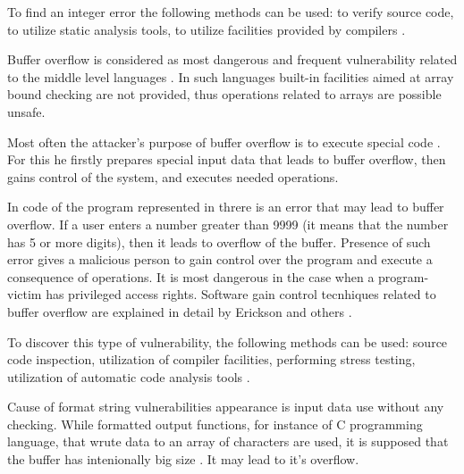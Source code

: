 %
To find an integer error the following methods can be used: to verify source code, to utilize static analysis tools, to utilize facilities provided by compilers  . 



%
Buffer overflow is considered as most dangerous and frequent vulnerability related to the middle level languages . 
%
In such languages built-in facilities aimed at array bound checking are not provided, thus operations related to arrays are possible unsafe. 

%
Most often the attacker's purpose of buffer overflow is to execute special code . 
%
For this he firstly prepares special input data that leads to buffer overflow, then gains control of the system, and executes needed operations. 

%
In code of the program represented in  threre is an error that may lead to buffer overflow. 
%
If a user enters a number greater than 9999 (it means that the number has 5 or more digits), then it leads to overflow of the  buffer. 
%
Presence of such error gives a malicious person to gain control over the program and execute a consequence of operations. 
%
It is most dangerous in the case when a program-victim has privileged access rights. 
%
Software gain control tecnhiques related to buffer overflow are explained in detail by Erickson and others  . 

%
To discover this type of vulnerability, the following methods can be used: source code inspection, utilization of compiler facilities, performing stress testing, utilization of automatic code analysis tools   . 



%
Cause of format string vulnerabilities appearance is input data use without any checking. 
%
While formatted output functions, for instance  of C programming language, that wrute data to an array of characters are used, it is supposed that the buffer has intenionally big size . 
%
It may lead to it's overflow. 

